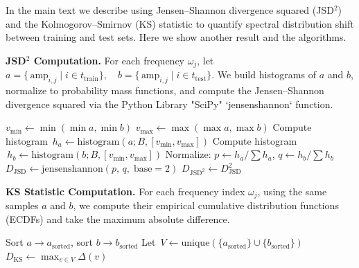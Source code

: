 \documentclass[sigconf,anonymous,review]{acmart}
\begin{document}
In the main text we describe using Jensen–Shannon divergence squared (JSD$^2$) and the Kolmogorov–Smirnov (KS) statistic to quantify spectral distribution shift between training and test sets. 
Here we show another result and the algorithms.

\textbf{JSD$^2$ Computation.}
For each frequency $\omega_j$, let
$a = \bigl\{\,\text{amp}_{i,j}\mid i\in t_{\mathrm{train}}\bigr\},\quad
b = \bigl\{\,\text{amp}_{i,j}\mid i\in t_{\mathrm{test}}\bigr\}.$
We build histograms of $a$ and $b$, normalize to probability mass functions, and compute the Jensen–Shannon divergence squared via the Python Library "SciPy" `jensenshannon` function.

\begin{algorithm}[t]
  \caption{Compute JSD$^2$ between two samples}
  \label{alg:jsd2}
  $v_{\min} \gets \min(\min a, \min b)$\;
  $v_{\max} \gets \max(\max a, \max b)$\;
  Compute histogram $\,h_a\gets\mathrm{histogram}(a;B,[v_{\min},v_{\max}])$\;
  Compute histogram $\,h_b\gets\mathrm{histogram}(b;B,[v_{\min},v_{\max}])$\;
  Normalize: $p\gets h_a / \sum h_a$, \quad $q\gets h_b / \sum h_b$\;
  $D_{\mathrm{JSD}}\gets \mathrm{jensenshannon}(p,\,q,\;\mathrm{base}=2)$\;
  $D_{\mathrm{JSD}^2}\gets D_{\mathrm{JSD}}^2$\;
\end{algorithm}


\textbf{KS Statistic Computation.}
For each frequency index $\omega_j$, using the same samples $a$ and $b$, we compute their empirical cumulative distribution functions (ECDFs) and take the maximum absolute difference.

\begin{algorithm}[t]
  \caption{Compute Kolmogorov–Smirnov statistic}
  \label{alg:ks}
  Sort $a\to a_{\mathrm{sorted}}$, \quad sort $b\to b_{\mathrm{sorted}}$\;
  Let $\,V\gets \mathrm{unique}(\{a_{\mathrm{sorted}}\}\cup\{b_{\mathrm{sorted}}\})$\;
  $D_{\mathrm{KS}}\gets \max_{v\in V}\Delta(v)$\;
\end{algorithm}
\end{document}
